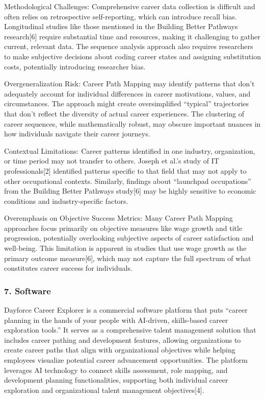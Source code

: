 \documentclass[./main.tex]{subfiles}
\begin{document}
Methodological Challenges: Comprehensive career data collection is
difficult and often relies on retrospective self-reporting, which can
introduce recall bias. Longitudinal studies like those mentioned in the
Building Better Pathways research{[}6{]} require substantial time and
resources, making it challenging to gather current, relevant data. The
sequence analysis approach also requires researchers to make subjective
decisions about coding career states and assigning substitution costs,
potentially introducing researcher bias.

Overgeneralization Risk: Career Path Mapping may identify patterns that
don't adequately account for individual differences in career
motivations, values, and circumstances. The approach might create
oversimplified ``typical'' trajectories that don't reflect the diversity
of actual career experiences. The clustering of career sequences, while
mathematically robust, may obscure important nuances in how individuals
navigate their career journeys.

Contextual Limitations: Career patterns identified in one industry,
organization, or time period may not transfer to others. Joseph et al.'s
study of IT professionals{[}2{]} identified patterns specific to that
field that may not apply to other occupational contexts. Similarly,
findings about ``launchpad occupations'' from the Building Better
Pathways study{[}6{]} may be highly sensitive to economic conditions and
industry-specific factors.

Overemphasis on Objective Success Metrics: Many Career Path Mapping
approaches focus primarily on objective measures like wage growth and
title progression, potentially overlooking subjective aspects of career
satisfaction and well-being. This limitation is apparent in studies that
use wage growth as the primary outcome measure{[}6{]}, which may not
capture the full spectrum of what constitutes career success for
individuals.

\subsubsection{7. Software}\label{software}

Dayforce Career Explorer is a commercial software platform that puts
``career planning in the hands of your people with AI-driven,
skills-based career exploration tools.'' It serves as a comprehensive
talent management solution that includes career pathing and development
features, allowing organizations to create career paths that align with
organizational objectives while helping employees visualize potential
career advancement opportunities. The platform leverages AI technology
to connect skills assessment, role mapping, and development planning
functionalities, supporting both individual career exploration and
organizational talent management objectives{[}4{]}.
\end{document}
